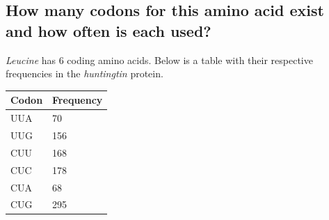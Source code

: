 \medskip


\subsection{How many codons for this amino acid exist and how often is each used?}

\textit{Leucine} has 6 coding amino acids. Below is a table with their respective frequencies in the \textit{huntingtin} protein.

\bigskip

\begin{center}
	\begin{tabu} to 0.4\textwidth{ | X[c] | X[c] | }
		\hline
		Codon & Frequency \\
		\hline
		UUA & 70 \\
		UUG & 156 \\
		CUU & 168 \\
		CUC & 178 \\
		CUA & 68 \\
		CUG & 295 \\
		\hline
	\end{tabu}
\end{center}

\clearpage

\newpage
